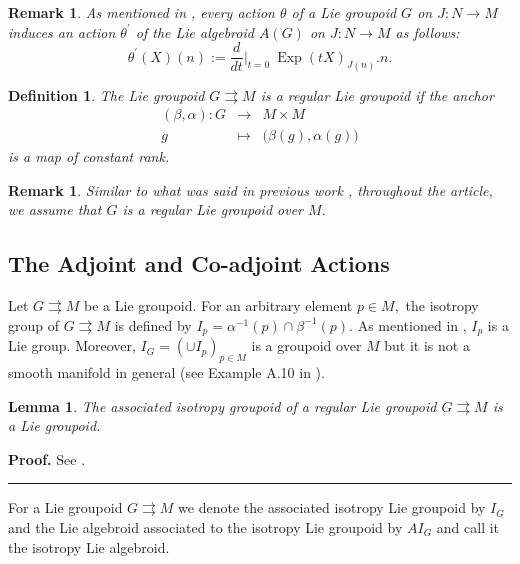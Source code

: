 \documentclass{article}
\newtheorem{definition}[theorem]{Definition}
\newtheorem{lemma}[theorem]{Lemma}
\newtheorem{remark}[theorem]{Remark}
\newenvironment{proof}[1][Proof]{\noindent\textbf{#1.} }{\ \rule{0.5em}{0.5em}}
\begin{document}
\begin{remark}
\label{action remark}
As mentioned in \cite{Bos}, every action $\theta$ of a Lie groupoid $G$ on $ J : N \longrightarrow M $ induces an action $\theta^{\prime}$ of the Lie algebroid $ A(G) $ on $ J : N \longrightarrow M $ as follows:
$$ \theta ^{\prime} (X) (n) := \dfrac{d}{dt} \vert _{t=0} ~\operatorname{Exp} ( t X )_{J(n)} . n.$$
\end{remark}

\begin{definition}
The Lie groupoid $G \rightrightarrows M $ is a regular Lie groupoid if the anchor
\begin{eqnarray}
( \beta , \alpha ) : G &\longrightarrow & M \times M \nonumber \\
g &\longmapsto & \big( \beta (g) , \alpha(g) \big)  \nonumber
\end{eqnarray}
is a map of constant rank.
\end{definition} 

\begin{remark}
Similar to what was said in previous work \cite{HA2}, throughout the article, we assume that $G$ is a regular Lie groupoid over $M.$
\end{remark}

\subsection{The Adjoint and Co-adjoint Actions}

Let $G \rightrightarrows M $ be a Lie groupoid. For an arbitrary element $p \in M,$ the isotropy group of $ G \rightrightarrows M $ is defined by $ I_{p} = \alpha ^{-1} (p) \cap \beta ^{-1} (p).$ As mentioned in \cite{HA2}, $I_{p}$ is a Lie group. Moreover, $I_{G} = ( \cup I_{p} )_{p \in M}$ is a groupoid over $M$ but it is not a smooth manifold in general (see Example A.10 in \cite{Schmeding}).

\begin{lemma}
The associated isotropy groupoid of a regular Lie groupoid $G \rightrightarrows M $ is a Lie groupoid.
\end{lemma}
\begin{proof}
See \cite{Schmeding}.
\end{proof}

For a Lie groupoid $G \rightrightarrows M$ we denote the associated isotropy Lie groupoid by $I_{G}$ and the Lie algebroid associated to the isotropy Lie groupoid by $A I_{G}$ and call it the isotropy Lie algebroid.
\end{document}
